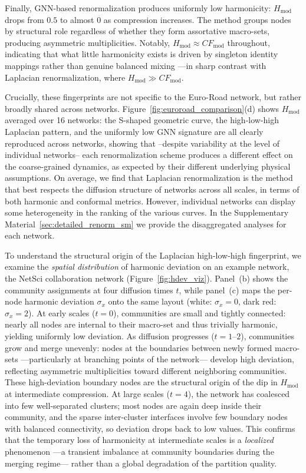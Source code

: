 \documentclass[twocolumn,superscriptaddress,tightenlines,aps,prx,floatfix]{revtex4-2}
\begin{document}
\begin{bibunit}
Finally, GNN-based renormalization produces uniformly low harmonicity: $H_{\text{mod}}$ drops from $0.5$ to almost $0$ as compression increases. 
The method groups nodes by structural role regardless of whether they form assortative macro-sets, producing asymmetric multiplicities. 
Notably, $H_{\text{mod}} \approx CF_{\text{mod}}$ throughout, indicating that what little harmonicity exists is driven by singleton identity mappings rather than genuine balanced mixing ---in sharp contrast with Laplacian renormalization, where $H_{\text{mod}} \gg CF_{\text{mod}}$.

Crucially, these fingerprints are not specific to the Euro-Road network, but rather broadly shared across networks. 
Figure~\ref{fig:euroroad_comparison}(d) shows $H_{\text{mod}}$ averaged over 16 networks: the S-shaped geometric curve, the high-low-high Laplacian pattern, and the uniformly low GNN signature are all clearly reproduced across networks, showing that --despite variability at the level of individual networks-- each renormalization scheme produces a different effect on the coarse-grained dynamics, as expected by their different underlying physical assumptions.
On average, we find that Laplacian renormalization is the method that best respects the diffusion structure of networks across all scales, in terms of both harmonic and conformal metrics. 
However, individual networks can display some heterogeneity in the ranking of the various curves. In the Supplementary Material~\ref{sec:detailed_renorm_sm} we provide the disaggregated analyses for each network.

To understand the structural origin of the Laplacian high-low-high fingerprint, we examine the \emph{spatial distribution} of harmonic deviation on an example network, the NetSci collaboration network (Figure~\ref{fig:hdev_viz}).
Panel~(b) shows the community assignments at four diffusion times $t$, while panel~(c) maps the per-node harmonic deviation $\sigma_x$ onto the same layout (white: $\sigma_x = 0$, dark red: $\sigma_x = 2$).
At early scales ($t = 0$), communities are small and tightly connected: nearly all nodes are internal to their macro-set and thus trivially harmonic, yielding uniformly low deviation.
As diffusion progresses ($t = 1$--$2$), communities grow and merge unevenly: nodes at the boundaries between newly formed macro-sets ---particularly at branching points of the network--- develop high deviation, reflecting asymmetric multiplicities toward different neighboring communities.
These high-deviation boundary nodes are the structural origin of the dip in $H_{\text{mod}}$ at intermediate compression.
At large scales ($t = 4$), the network has coalesced into few well-separated clusters; most nodes are again deep inside their community, and the sparse inter-cluster interfaces involve few boundary nodes with balanced connectivity, so deviation drops back to low values.
This confirms that the temporary loss of harmonicity at intermediate scales is a \emph{localized} phenomenon ---a transient imbalance at community boundaries during the merging regime--- rather than a global degradation of the partition quality.


\end{bibunit}
\end{document}
